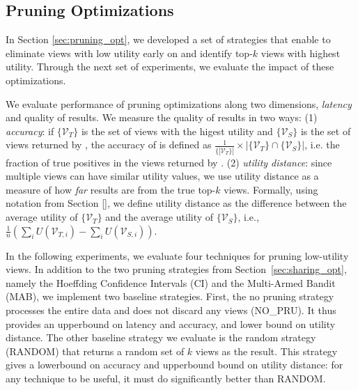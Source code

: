 \subsection{Pruning Optimizations}
\label{sec:custom_execution_engine_expts}
In Section \ref{sec:pruning_opt}, we developed a set of strategies that enable \SeeDB to eliminate views with low utility early on and identify top-$k$ views with highest utility.
Through the next set of experiments, we evaluate 
the impact of these optimizations.

We evaluate performance of pruning optimizations along two dimensions, {\em latency} and
quality of results.
We measure the quality of results in two ways: 
(1) {\em accuracy}: if $\{\mathcal{V}_T\}$
is the set of views with the higest utility and $\{\mathcal{V}_S\}$ is the set of views returned by
\SeeDB, the accuracy of \SeeDB is defined as $\frac{1}{\{|\mathcal{V}_T\}|} \times 
|\{\mathcal{V}_T\} \cap \{\mathcal{V}_S\}|$, i.e. the
fraction of true positives in the views returned by \SeeDB. (2) {\em utility distance}: since multiple
views can have similar utility values, we use utility distance as a measure of how {\it far} \SeeDB 
results are from the true top-$k$ views. 
Formally, using notation from Section \ref{}, we define utility distance as the difference between the average utility of $\{\mathcal{V}_T\}$ 
and the average utility of $\{\mathcal{V}_S\}$, i.e., $\frac{1}{n}(\sum_{i}U(\mathcal{V}_{T,i}) - 
\sum_{i}U(\mathcal{V}_{S,i}))$.

In the following experiments, we evaluate four techniques for pruning low-utility views.
In addition to the two pruning strategies from Section~\ref{sec:sharing_opt}, 
namely the Hoeffding Confidence Intervals (CI) and the Multi-Armed Bandit (MAB),
we implement two baseline strategies.
First, the no pruning strategy processes the entire data and does not discard any views (NO\_PRU). 
It thus provides an upperbound on latency and accuracy, and lower bound on utility distance.
The other baseline strategy we evaluate is the random strategy (RANDOM) that returns a random 
set of $k$ views as the result.
This strategy gives a lowerbound on accuracy and upperbound bound on utility distance: for any 
technique to be useful, it must do significantly better than RANDOM.

